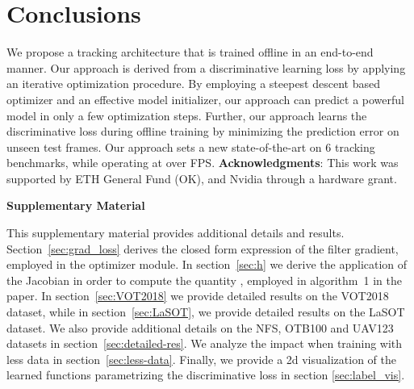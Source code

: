 \documentclass[10pt,twocolumn,letterpaper]{article}
\begin{document}
 \section{Conclusions}
We propose a tracking architecture that is trained offline in an end-to-end manner. Our approach is derived from a discriminative learning loss by applying an iterative optimization procedure. By employing a steepest descent based optimizer and an effective model initializer, our approach can predict a powerful model in only a few optimization steps. Further, our approach learns the discriminative loss during offline training by minimizing the prediction error on unseen test frames. Our approach sets a new state-of-the-art on 6 tracking benchmarks, while operating at over  FPS. 
\noindent\textbf{Acknowledgments}:
This work was supported by ETH General Fund (OK), and Nvidia through a hardware grant.


{\small


}

\clearpage
\newcommand{\comment}[2]{\textcolor{red}{\textbf{#1}: \textit{#2}}}

\newcommand{\charfunc}{\mathbbm{1}}

\def\httilde{\mbox{\tt\raisebox{-.5ex}{\symbol{126}}}}

\setcounter{equation}{0}
\setcounter{figure}{0}
\setcounter{table}{0}
\setcounter{section}{0}

\renewcommand{\theequation}{S\arabic{equation}}
\renewcommand{\thefigure}{S\arabic{figure}}
\renewcommand{\thetable}{S\arabic{table}}
\renewcommand{\thesection}{S\arabic{section}}

\begin{center}
	\textbf{\large Supplementary Material}
\end{center}

This supplementary material provides additional details and results. Section~\ref{sec:grad_loss} derives the closed form expression of the filter gradient, employed in the optimizer module. In section~\ref{sec:h} we derive the application of the Jacobian in order to compute the quantity , employed in algorithm~1 in the paper. In section~\ref{sec:VOT2018} we provide detailed results on the VOT2018 dataset, while in section~\ref{sec:LaSOT}, we provide detailed results on the LaSOT dataset. We also provide additional details on the NFS, OTB100 and UAV123 datasets in section~\ref{sec:detailed-res}. We analyze the impact when training with less data in section~\ref{sec:less-data}. Finally, we provide a 2d visualization of the learned functions parametrizing the discriminative loss in section \ref{sec:label_vis}.
\end{document}
